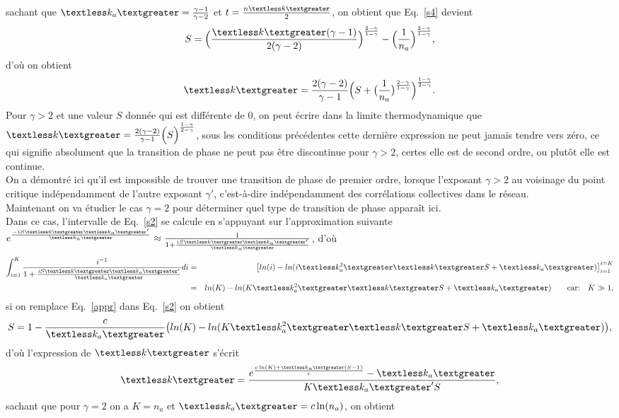  sachant que $\kma=\frac{\gamma-1}{\gamma-2}$ et $t=\frac{n\km}{2}$, on obtient que Eq.~\eqref{s4} devient
  \begin{equation}
  S=\Big(\frac{\km (\gamma-1)}{2(\gamma-2)}\Big)^{\frac{2-\gamma}{1-\gamma}}-\Big(\frac{1}{n_a}\Big)^{\frac{2-\gamma}{1-\gamma}},
  \label{s5}
  \end{equation}
  d'où on obtient 
    \begin{equation}
    \km=\frac{2(\gamma-2)}{\gamma-1}\Big(S+\big(\frac{1}{n_a}\big)^{\frac{2-\gamma}{1-\gamma}}\Big)^{\frac{1-\gamma}{2-\gamma}}.
    \end{equation}
  Pour $\gamma>2$ et une valeur $S$ donnée qui est différente de $0$, on peut écrire dans la limite thermodynamique que $ \km=\frac{2(\gamma-2)}{\gamma-1}\Big(S\Big)^{\frac{1-\gamma}{2-\gamma}}$, sous les conditions précédentes 
  cette dernière expression ne peut jamais tendre vers zéro, ce qui signifie absolument que la transition de phase ne peut pas être discontinue pour $\gamma>2$, certes elle est de second ordre, ou plutôt elle est continue.\\
  On a démontré ici qu'il est impossible de trouver une transition de phase de premier ordre, lorsque l'exposant $\gamma>2$ au voisinage du point critique indépendamment de l'autre exposant $\gamma'$, c'est-à-dire indépendamment des corrélations collectives dans le réseau.\\
  Maintenant on va étudier le cas $\gamma=2$ pour déterminer quel type de transition de phase apparaît ici.\\
   Dans ce cas, l'intervalle de Eq.~\eqref{s2} se calcule en s'appuyant sur l'approximation suivante  $e^{\frac{-iS\km\kma'}{\kma}}\approx \frac{1}{1+\frac{iS\km\kma'}{\kma}}$, d'où
  \begin{eqnarray}
  \int_{i=1}^K\frac{i^{-1}}{1+\frac{iS\km\kma'}{\kma}}di&=&\big[ln(i)-ln(i\kmaa\km S+\kma)\big]_{i=1}^{i=K}\nonumber\\
  &=&ln(K)-ln(K\kmaa\km S+\kma)  \quad \quad  \text{car:} \quad K\gg 1,
  \label{appr}
  \end{eqnarray}
  si on remplace Eq.~\eqref{appr} dans Eq.~\eqref{s2} on obtient 
  \begin{equation}
  S=1-\frac{c}{\kma}\big(ln(K)-ln(K\kmaa\km S+\kma)\big),
  \end{equation}
  d'où l'expression de $\km$ s'écrit
  \begin{equation}
 \km=\frac{e^{\frac{c\ln(K)+\kma(S-1)}{c}}-\kma}{K\kma' S},
  \end{equation}
 sachant que pour $\gamma=2$ on a $K=n_a$ et $\kma=c\ln(n_a)$, on obtient
